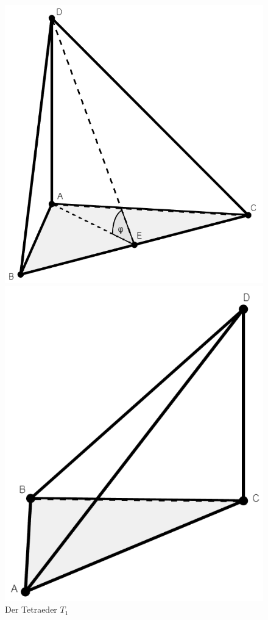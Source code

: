 \documentclass[11pt,titlepage]{article}
\theoremstyle{definition}
\theoremstyle{remark}
\begin{document}
	\begin{figure}[!htbp]
		\centering
		\begin{minipage}[m]{0.4\textwidth}
			\hspace{-1cm}
			\includegraphics[scale=0.37]{Tetraeder1}
			\caption{Der Tetraeder $T_1$}
			\label{Abb.5}
		\end{minipage}
		\begin{minipage}[m]{0.4\textwidth}
			\hspace{1cm}
			\includegraphics[scale=0.38]{Tetraeder2}

\end{minipage}
\end{figure}
\end{document}
